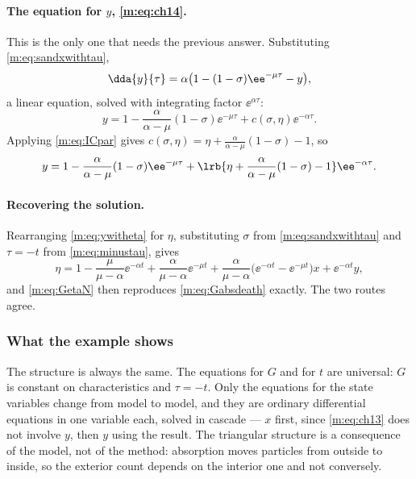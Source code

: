 \paragraph{The equation for $y$, \eqref{m:eq:ch14}.}
This is the only one that needs the previous answer. Substituting
\cref{m:eq:sandxwithtau},
\begin{equation*}
\dda{y}{\tau} = \alpha\bigl(1-(1-\sigma)\ee^{-\mu\tau}-y\bigr),
\end{equation*}
a linear equation, solved with integrating factor $\ee^{\alpha\tau}$:
\begin{equation*}
y = 1-\frac{\alpha}{\alpha-\mu}(1-\sigma)\ee^{-\mu\tau} + c(\sigma,\eta)\ee^{-\alpha\tau} .
\end{equation*}
Applying \cref{m:eq:ICpar} gives
$c(\sigma,\eta) = \eta+\frac{\alpha}{\alpha-\mu}(1-\sigma)-1$, so
\begin{equation}
\label{m:eq:ywitheta}
y = 1-\frac{\alpha}{\alpha-\mu}(1-\sigma)\ee^{-\mu\tau}
+ \lrb{\eta+\frac{\alpha}{\alpha-\mu}(1-\sigma)-1}\ee^{-\alpha\tau} .
\end{equation}

\paragraph{Recovering the solution.}
Rearranging \cref{m:eq:ywitheta} for $\eta$, substituting $\sigma$ from
\cref{m:eq:sandxwithtau} and $\tau=-t$ from \cref{m:eq:minustau}, gives
\begin{equation*}
\eta = 1-\frac{\mu}{\mu-\alpha}\ee^{-\alpha t} + \frac{\alpha}{\mu-\alpha}\ee^{-\mu t}
+ \frac{\alpha}{\mu-\alpha}\bigl(\ee^{-\alpha t}-\ee^{-\mu t}\bigr)x
+ \ee^{-\alpha t}y ,
\end{equation*}
and \cref{m:eq:GetaN} then reproduces \cref{m:eq:Gabsdeath} exactly. The two routes
agree.

\subsubsection{What the example shows}
\label{m:sec:mocwhat}

The structure is always the same. The equations for $G$ and for $t$ are universal:
$G$ is constant on characteristics and $\tau=-t$. Only the equations for the state
variables change from model to model, and they are ordinary differential equations
in one variable each, solved in cascade --- $x$ first, since \cref{m:eq:ch13} does
not involve $y$, then $y$ using the result. The triangular structure is a
consequence of the model, not of the method: absorption moves particles from
outside to inside, so the exterior count depends on the interior one and not
conversely.

